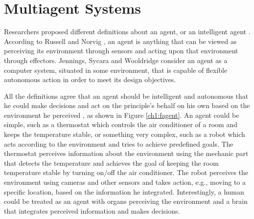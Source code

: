 \section{Multiagent Systems}
\label{ch1:mas}

Researchers proposed different definitions about an agent, or an intelligent agent \cite{muller1997}. According to Russell and Norvig \cite{russell2009}, an agent is anything that can be viewed as perceiving its environment through sensors and acting upon that environment through effectors. Jennings, Sycara and Wooldridge \cite{jennings1998} consider an agent as a computer system, situated in some environment, that is capable of flexible autonomous action in order to meet its design objectives.

All the definitions agree that an agent should be intelligent and autonomous that he could make decisions and act on the principle's behalf on his own based on the environment he perceived \cite{jennings1998} \cite{russell2009} \cite{wooldridge2009}, as shown in Figure \ref{ch1:fagent}. An agent could be simple, such as a thermostat which controls the air conditioner of a room and keeps the temperature stable, or something very complex, such as a robot which acts according to the environment and tries to achieve predefined goals. The thermostat perceives information about the environment using the mechanic part that detects the temperature and achieves the goal of keeping the room temperature stable by turning on/off the air conditioner. The robot perceives the environment using cameras and other sensors and takes action, e.g., moving to a specific location, based on the information he integrated. Interestingly, a human could be treated as an agent with organs perceiving the environment and a brain that integrates perceived information and makes decisions. 

